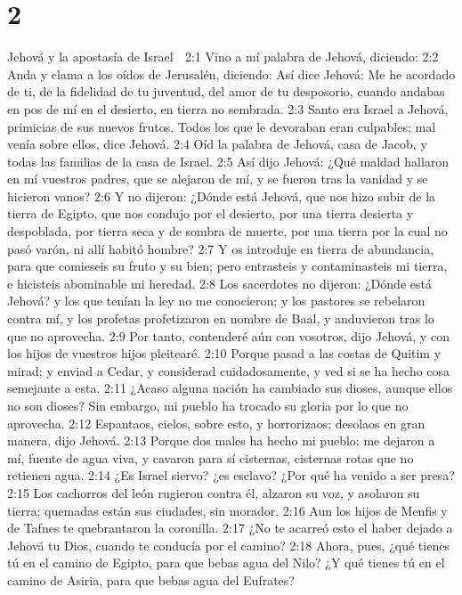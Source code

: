 \chapter{2}

Jehová y la apostasía de Israel  

2:1 Vino a mí palabra de Jehová, diciendo:  
2:2 Anda y clama a los oídos de Jerusalén, diciendo: Así dice Jehová: Me he acordado de ti, de la fidelidad de tu juventud, del amor de tu desposorio, cuando andabas en pos de mí en el desierto, en tierra no sembrada.  
2:3 Santo era Israel a Jehová, primicias de sus nuevos frutos. Todos los que le devoraban eran culpables; mal venía sobre ellos, dice Jehová.  
2:4 Oíd la palabra de Jehová, casa de Jacob, y todas las familias de la casa de Israel.  
2:5 Así dijo Jehová: ¿Qué maldad hallaron en mí vuestros padres, que se alejaron de mí, y se fueron tras la vanidad y se hicieron vanos?  
2:6 Y no dijeron: ¿Dónde está Jehová, que nos hizo subir de la tierra de Egipto, que nos condujo por el desierto, por una tierra desierta y despoblada, por tierra seca y de sombra de muerte, por una tierra por la cual no pasó varón, ni allí habitó hombre?  
2:7 Y os introduje en tierra de abundancia, para que comieseis su fruto y su bien; pero entrasteis y contaminasteis mi tierra, e hicisteis abominable mi heredad.  
2:8 Los sacerdotes no dijeron: ¿Dónde está Jehová? y los que tenían la ley no me conocieron; y los pastores se rebelaron contra mí, y los profetas profetizaron en nombre de Baal, y anduvieron tras lo que no aprovecha.  
2:9 Por tanto, contenderé aún con vosotros, dijo Jehová, y con los hijos de vuestros hijos pleitearé.  
2:10 Porque pasad a las costas de Quitim y mirad; y enviad a Cedar, y considerad cuidadosamente, y ved si se ha hecho cosa semejante a esta.  
2:11 ¿Acaso alguna nación ha cambiado sus dioses, aunque ellos no son dioses? Sin embargo, mi pueblo ha trocado su gloria por lo que no aprovecha.  
2:12 Espantaos, cielos, sobre esto, y horrorizaos; desolaos en gran manera, dijo Jehová.  
2:13 Porque dos males ha hecho mi pueblo: me dejaron a mí, fuente de agua viva, y cavaron para sí cisternas, cisternas rotas que no retienen agua.  
2:14 ¿Es Israel siervo? ¿es esclavo? ¿Por qué ha venido a ser presa?  
2:15 Los cachorros del león rugieron contra él, alzaron su voz, y asolaron su tierra; quemadas están sus ciudades, sin morador.  
2:16 Aun los hijos de Menfis y de Tafnes te quebrantaron la coronilla.  
2:17 ¿No te acarreó esto el haber dejado a Jehová tu Dios, cuando te conducía por el camino?  
2:18 Ahora, pues, ¿qué tienes tú en el camino de Egipto, para que bebas agua del Nilo? ¿Y qué tienes tú en el camino de Asiria, para que bebas agua del Eufrates?  
